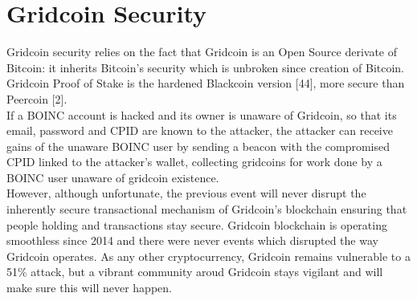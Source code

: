 \section{Gridcoin Security}

Gridcoin security relies on the fact that Gridcoin is an Open Source derivate of Bitcoin: it inherits Bitcoin's security which is unbroken since creation of Bitcoin. Gridcoin Proof of Stake is the hardened Blackcoin version [44], more secure than Peercoin [2].\\ 

If a BOINC account is hacked and its owner is unaware of Gridcoin, so that its email, password and CPID are known to the attacker, the attacker can receive gains of the unaware BOINC user by sending a beacon with the compromised CPID linked to the attacker's wallet, collecting gridcoins for work done by a BOINC user unaware of gridcoin existence.\\

However, although unfortunate, the previous event will never disrupt the inherently secure transactional mechanism of Gridcoin's blockchain ensuring that people holding and transactions stay secure. Gridcoin blockchain is operating smoothless since 2014 and there were never events which disrupted the way Gridcoin operates. As any other cryptocurrency, Gridcoin remains vulnerable to a 51\% attack, but a vibrant community aroud Gridcoin stays vigilant and will make sure this will never happen.